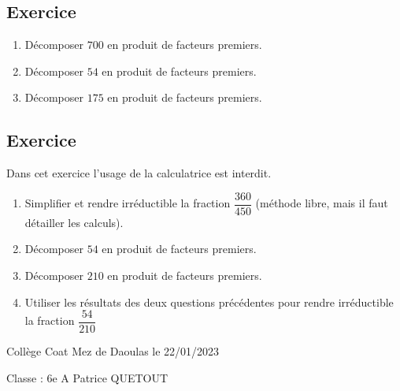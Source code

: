\documentclass[a4paper,12pt,fleqn]{article}
\newcounter{exo}          				%
\newcommand{\exo}{					%
  	\stepcounter{exo}        			%
  	\subsection*{Exercice \no{}\theexo}}
\newcommand{\titreitem}[1]{
\Ovalbox{\makebox[.99\linewidth][l]{{Compétence : {#1} }}}
\vspace{0.3cm}} %
\begin{document}
\vspace{0.5cm}

\medskip
\begin{minipage}{0.99\linewidth}

\exo

\begin{enumerate}

\item Décomposer $700$ en produit de facteurs premiers.
\item Décomposer $54$ en produit de facteurs premiers.
\item Décomposer $175$ en produit de facteurs premiers.

\end{enumerate}
\end{minipage}

\vspace{0.5cm}

\medskip
\begin{minipage}{0.99\linewidth}

\exo

Dans cet exercice l'usage de la calculatrice est interdit.

\begin{enumerate}

\item Simplifier et rendre irréductible la fraction $\dfrac{360}{450}$ (méthode libre, mais il faut détailler les calculs).
\item Décomposer $54$ en produit de facteurs premiers.
\item Décomposer $210$ en produit de facteurs premiers.
\item Utiliser les résultats des deux questions précédentes pour rendre irréductible la fraction $\dfrac{54}{210}$
\end{enumerate}
\end{minipage}

\vspace{0.5cm}

\medskip
\newpage
\setcounter{exo}{0}


Collège Coat Mez de Daoulas  \hfill  le 22/01/2023

Classe : 6e A \hfill Patrice QUETOUT
\end{document}
